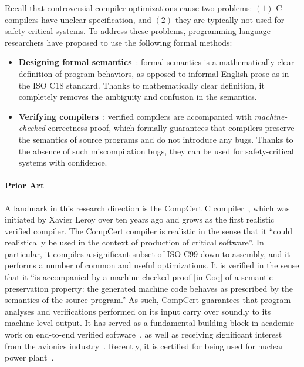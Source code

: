 Recall that controversial compiler optimizations cause two problems: $(1)$ C compilers have unclear
specification, and $(2)$ they are typically not used for safety-critical systems.  To address these
problems, programming language researchers have proposed to use the following formal methods:

\begin{itemize}
\item \textbf{Designing formal semantics}~\cite{norrish1998c,leroy:compcert,ellison2012executable}:
  formal semantics is a mathematically clear definition of program behaviors, as opposed to informal
  English prose as in the ISO C18 standard.  Thanks to mathematically clear definition, it
  completely removes the ambiguity and confusion in the semantics.

\item \textbf{Verifying compilers}~\cite{compcert,vellvm}: verified compilers are accompanied with
  \emph{machine-checked} correctness proof, which formally guarantees that compilers preserve the
  semantics of source programs and do not introduce any bugs.  Thanks to the absence of such
  miscompilation bugs, they can be used for safety-critical systems with confidence.
\end{itemize}


\paragraph{Prior Art}

A landmark in this research direction is the CompCert C compiler~\cite{compcert}, which was
initiated by Xavier Leroy over ten years ago and grows as the first realistic verified compiler.
The CompCert compiler is realistic in the sense that it ``could realistically be used in the context
of production of critical software''.  In particular, it compiles a significant subset of ISO C99
down to assembly, and it performs a number of common and useful optimizations.  It is verified in
the sense that it ``is accompanied by a machine-checked proof [in Coq] of a semantic preservation
property: the generated machine code behaves as prescribed by the semantics of the source program.''
As such, CompCert guarantees that program analyses and verifications performed on its input carry
over soundly to its machine-level output.  It has served as a fundamental building block in academic
work on end-to-end verified software~\cite{TODO}, as well as receiving significant interest from the
avionics industry~\cite{TODO}.  Recently, it is certified for being used for nuclear power
plant~\cite{compcert-nuclear}.

